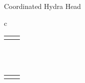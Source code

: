 \begin{figure*}[t!]
\begin{algobox}{Coordinated Hydra Head}
\begin{tabular}{c}
\begin{tabular}{c@{}c}
{\begin{walgo}{0.65}
					\end{walgo}
				}
				 &

				\adjustbox{valign=t,scale=\sfact}{
					\begin{walgo}{0.6}
						\On{$(\hpAS,s,\msSig_j)$ from $\party_j$}{ %

							\Req{} $s \in \{\hats,\hats+1\}$
							\; %

							\Wait{$\hats=s$
							}{ %

								\Req{} $(j, \cdot) \notin \hatSigma$ \; %

								$\hatSigma \gets \hatSigma \cup (j,\msSig_j)$ \; %

								\If{$\forall k \in [1..n]: (k,\cdot) \in \hatSigma$}{ %
									$\msCSig \gets \msComb(\hydraKeys, \hatSigma)$ \; %

									$\eta' \gets (\hats, \combine(\hatmU))$ \; %
									\Req{} $\msVfy(\hydraKeysAgg, (\cid || \eta_{0} || \eta'), \msCSig)$ \;
									$\barmU \gets \hatmU$ \; %
									$\bars \gets \hats$ \; %
									$\barsigma \gets \msCSig$ \; %

									$\forall \tx \in \mT_{res} : \Out (\hpConf,\tx)$ \; %

									\If{$\hats = \bars \land \hpLdr(\bars + 1) = i$}{%
										\mf{What if $\hatmT$ empty?}

										\Multi{} $(\hpRS,\bars+1,\hatmT^{\downarrow1})$ \;%
									}
								}
							} }
					\end{walgo}

				}
			\end{tabular}

			\\
			\multicolumn{1}{l}{\line(1,0){490}} %
			\\

			\begin{tabular}{c c}
				\adjustbox{valign=t,scale=\sfact}{
					\begin{walgo}{0.6}

						\On{$(\hpClose)$ from client}{ %
							$\eta' \gets (\bars, \combine(\barmU))$ \; %
							$\xi \gets \barsigma$ \; %
							$\PostTx{}~(\mtxClose, \eta', \xi)$ \; %
						}

					\end{walgo}
				}
				 & \adjustbox{valign=t,scale=\sfact}{
					\begin{walgo}{0.6}

						\On{$(\gcChainClose, \eta) \lor (\gcChainContest, \eta)$ from chain}{ %
							$(s_{c}, \cdot) \gets \eta$ \;
							\If{$\bars > s_{c}$}{%
								$\eta' \gets (\bars, \combine(\barmU))$ \; %
								$\xi \gets \barsigma$ \; %
								$\PostTx{}~(\mtxContest, \eta', \xi)$ \; %
							} }


\end{walgo}}
\end{tabular}
\end{tabular}
\end{algobox}
\end{figure*}
